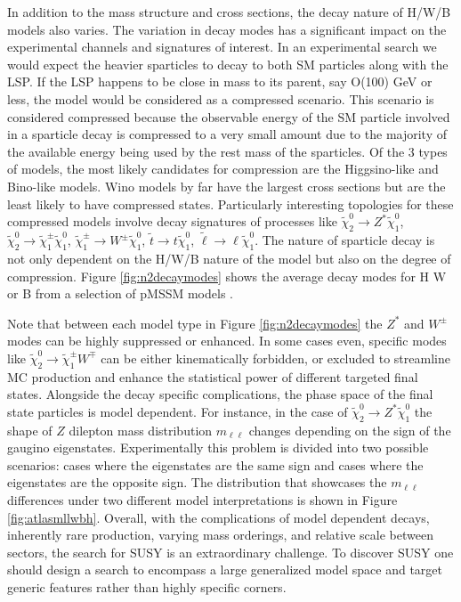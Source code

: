 In addition to the mass structure and cross sections, the decay nature of H/W/B models also varies. The variation in decay modes has a significant impact on the experimental channels and signatures of interest. In an experimental search we would expect the heavier sparticles to decay to both SM particles along with the LSP. If the LSP happens to be close in mass to its parent, say O(100) GeV or less, the model would be considered as a compressed scenario. This scenario is considered compressed because the observable energy of the SM particle involved in a sparticle decay is compressed to a very small amount due to the majority of the available energy being used by the rest mass of the sparticles. Of the 3 types of models, the most likely candidates for compression are the Higgsino-like and Bino-like models. Wino models by far have the largest cross sections but are the least likely to have compressed states. Particularly interesting topologies for these compressed models involve decay signatures of processes like $\tilde{\chi}^0_2 \rightarrow Z^*\tilde{\chi}^0_1 $, $\tilde{\chi}^0_2\rightarrow \tilde{\chi}^\pm_1 \tilde{\chi}^0_1 $, $\tilde{\chi}^\pm_1\rightarrow W^\pm \tilde{\chi}^0_1$, $\tilde{t}\rightarrow t \tilde{\chi}^0_1$, $\tilde{\ell}\rightarrow\ell \tilde{\chi}^0_1$. The nature of sparticle decay is not only dependent on the H/W/B nature of the model but also on the degree of compression. Figure \ref{fig:n2decaymodes} shows the average decay modes for H W or B from a selection of pMSSM models \cite{ATLAS:2015wrn}.


Note that between each model type in Figure \ref{fig:n2decaymodes} the $Z^*$ and $W^\pm$ modes can be highly suppressed or enhanced. In some cases even, specific modes like $\tilde{\chi}^0_2\rightarrow \tilde{\chi}_1^\pm W^\mp$ can be either kinematically forbidden, or excluded to streamline MC production and enhance the statistical power of different targeted final states. Alongside the decay specific complications, the phase space of the final state particles is model dependent. For instance, in the case of $\tilde{\chi}^0_2 \rightarrow Z^*\tilde{\chi}^0_1 $ the shape of $Z$ dilepton mass distribution $m_{\ell\ell}$  changes depending on the sign of the gaugino eigenstates. Experimentally this problem is divided into two possible scenarios: cases where the eigenstates are the same sign and cases where the eigenstates are the opposite sign. The distribution that showcases the $m_{\ell\ell}$ differences under two different model interpretations is shown in Figure \ref{fig:atlasmllwbh}. Overall, with the complications of model dependent decays, inherently rare production, varying mass orderings, and relative scale between sectors, the search for SUSY is an extraordinary challenge. To discover SUSY one should design a search to encompass a large generalized model space and target generic features rather than highly specific corners. 


